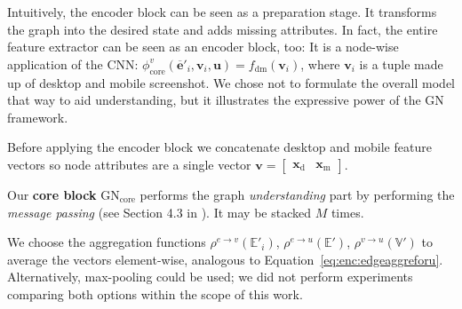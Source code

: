 Intuitively, the encoder block can be seen as a preparation stage. It transforms the graph into the desired state and adds missing attributes. In fact, the entire feature extractor can be seen as an encoder block, too: It is a node-wise application of the CNN: $\phi^v_\text{core}\left(\bm{\overline{e}}'_i,\bm{v}_i,\bm{u}\right)=f_\text{dm}(\bm{v}_i)$, where $\bm{v}_i$ is a tuple made up of desktop and mobile screenshot. We chose not to formulate the overall model that way to aid understanding, but it illustrates the expressive power of the GN framework.

Before applying the encoder block we concatenate desktop and mobile feature vectors so node attributes are a single vector $\bm{v}=\begin{bmatrix}\bm{x}_\text{d} & \bm{x}_\text{m}\end{bmatrix}$.

Our \textbf{core block} $\text{GN}_\text{core}$ performs the graph \textit{understanding} part by performing the \textit{message passing} (see Section 4.3 in \cite{deepmind:graphnets}). It may be stacked $M$ times. 

We choose the aggregation functions $\rho^{e\rightarrow v}\left(\mathbb{E}'_i\right)$, $\rho^{e\rightarrow u}\left(\mathbb{E}'\right)$, $\rho^{v\rightarrow u}\left(\mathbb{V}'\right)$ to average the vectors element-wise, analogous to Equation~\ref{eq:enc:edgeaggreforu}. Alternatively, max-pooling could be used; we did not perform experiments comparing both options within the scope of this work.

